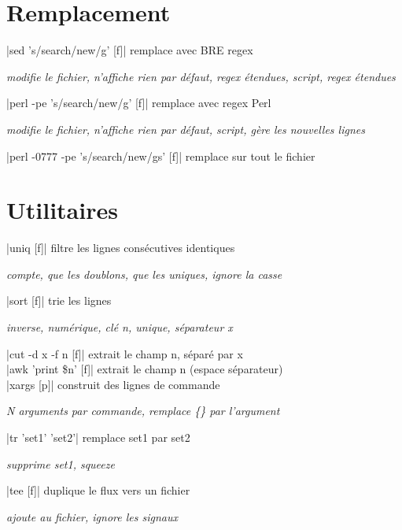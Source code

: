 \documentclass[9pt]{extarticle}
\newenvironment{cmdblock}{%
  \par\setlength{\parindent}{0pt}\setlength{\parskip}{0pt}%
  \RaggedRight%
}{\par}
\newlength{\cmdoptindent}
\newcommand{\cmdopt}[1]{%
  \hspace*{\cmdoptindent}%
  \begin{minipage}[t]{\dimexpr\linewidth-\cmdoptindent\relax}
    \RaggedRight \itshape #1%
  \end{minipage}\par
}
\begin{document}
\begin{multicols}{4}
    \section*{Remplacement}
    \begin{cmdblock}
        \code|sed 's/search/new/g' [f]| \quad remplace avec BRE regex \\
        \cmdopt{ modifie le fichier,
             n'affiche rien par défaut,
            \codx{-E} regex étendues,
            \codx{-e} script, \codx{-r} regex étendues}
        \code|perl -pe 's/search/new/g' [f]| \quad remplace avec regex Perl \\
        \cmdopt{ modifie le fichier,
             n'affiche rien par défaut,
            \codx{-e} script, \codx{-l} gère les nouvelles lignes}
        \code|perl -0777 -pe 's/search/new/gs' [f]| \quad remplace sur tout le fichier \\
    \end{cmdblock}

    \section*{Utilitaires}
    \begin{cmdblock}
        \code|uniq [f]| \quad filtre les lignes consécutives identiques \\
        \cmdopt{ compte,  que les doublons,
            \codx{-u} que les uniques, \codx{-i} ignore la casse}
        \code|sort [f]| \quad trie les lignes \\
        \cmdopt{ inverse,  numérique,
            \codx{-k n} clé n, \codx{-u} unique,
            \codx{-t x} séparateur x}
        \code|cut -d x -f n [f]| \quad extrait le champ n, séparé par x \\
        \code|awk '{print \$n}' [f]| \quad extrait le champ n (espace séparateur) \\
        \code|xargs [p]| \quad construit des lignes de commande \\
        \cmdopt{ N arguments par commande,
            \codx{-I \{\}} remplace \{\} par l'argument}
        \code|tr 'set1' 'set2'| \quad remplace set1 par set2 \\
        \cmdopt{ supprime set1,  squeeze}
        \code|tee [f]| \quad duplique le flux vers un fichier \\
        \cmdopt{ ajoute au fichier,  ignore les signaux}
    \end{cmdblock}


\end{multicols}
\end{document}
